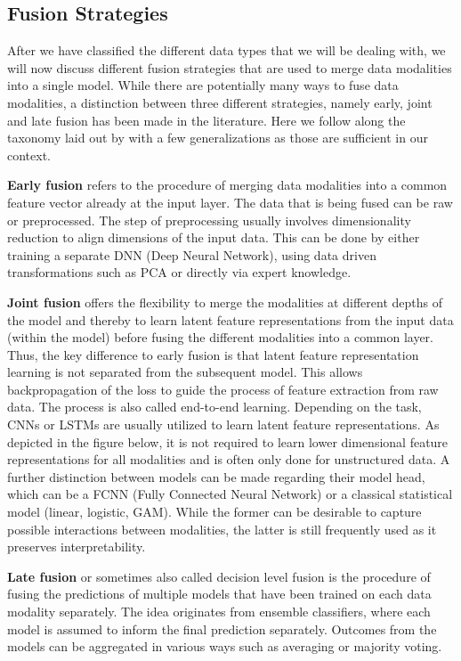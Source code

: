 \documentclass[
]{krantz}
\begin{document}
\hypertarget{fusion-strategies}{%
\subsection{Fusion Strategies}\label{fusion-strategies}}

After we have classified the different data types that we will be dealing with, we will now discuss different fusion strategies that are used to merge data modalities into a single model. While there are potentially many ways to fuse data modalities, a distinction between three different strategies, namely early, joint and late fusion has been made in the literature. Here we follow along the taxonomy laid out by \citet{HuangFusion2020} with a few generalizations as those are sufficient in our context.

\textbf{Early fusion} refers to the procedure of merging data modalities into a common feature vector already at the input layer. The data that is being fused can be raw or preprocessed. The step of preprocessing usually involves dimensionality reduction to align dimensions of the input data. This can be done by either training a separate DNN (Deep Neural Network), using data driven transformations such as PCA or directly via expert knowledge.

\textbf{Joint fusion} offers the flexibility to merge the modalities at different depths of the model and thereby to learn latent feature representations from the input data (within the model) before fusing the different modalities into a common layer. Thus, the key difference to early fusion is that latent feature representation learning is not separated from the subsequent model. This allows backpropagation of the loss to guide the process of feature extraction from raw data. The process is also called end-to-end learning. Depending on the task, CNNs or LSTMs are usually utilized to learn latent feature representations. As depicted in the figure below, it is not required to learn lower dimensional feature representations for all modalities and is often only done for unstructured data. A further distinction between models can be made regarding their model head, which can be a FCNN (Fully Connected Neural Network) or a classical statistical model (linear, logistic, GAM). While the former can be desirable to capture possible interactions between modalities, the latter is still frequently used as it preserves interpretability.

\textbf{Late fusion} or sometimes also called decision level fusion is the procedure of fusing the predictions of multiple models that have been trained on each data modality separately. The idea originates from ensemble classifiers, where each model is assumed to inform the final prediction separately. Outcomes from the models can be aggregated in various ways such as averaging or majority voting.
\end{document}
